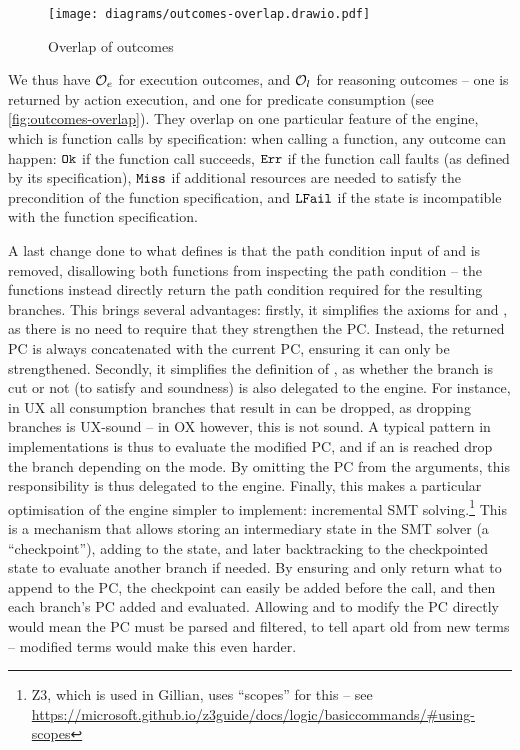 \begin{figure}
	\centering
	\texttt{[image: diagrams/outcomes-overlap.drawio.pdf]}
	\caption{Overlap of outcomes}
	\label{fig:outcomes-overlap}
\end{figure}

We thus have ${\cal O}_e$ for execution outcomes, and ${\cal O}_l$ for reasoning outcomes -- one is returned by action execution, and one for predicate consumption (see \autoref{fig:outcomes-overlap}). They overlap on one particular feature of the engine, which is function calls by specification: when calling a function, any outcome can happen: $\texttt{Ok}$ if the function call succeeds, $\texttt{Err}$ if the function call faults (as defined by its specification), $\texttt{Miss}$ if additional resources are needed to satisfy the precondition of the function specification, and $\texttt{LFail}$ if the state is incompatible with the function specification.

A last change done to what \cite{cse2} defines is that the path condition input of  \consume{} and \produce{} is removed, disallowing both functions from inspecting the path condition -- the functions instead directly return the path condition required for the resulting branches. This brings several advantages: firstly, it simplifies the axioms for \consume{} and \produce{}, as there is no need to require that they strengthen the PC. Instead, the returned PC is always concatenated with the current PC, ensuring it can only be strengthened. Secondly, it simplifies the definition of \consume{}, as whether the branch is cut or not (to satisfy \OX{} and \UX{} soundness) is also delegated to the engine. For instance, in UX all consumption branches that result in \LFail{} can be dropped, as dropping branches is UX-sound -- in OX however, this is not sound. A typical pattern in \consume{} implementations is thus to evaluate the modified PC, and if an \LFail{} is reached drop the branch depending on the mode. By omitting the PC from the arguments, this responsibility is thus delegated to the engine. Finally, this makes a particular optimisation of the engine simpler to implement: incremental SMT solving.\footnote{Z3, which is used in Gillian, uses ``scopes'' for this -- see \url{https://microsoft.github.io/z3guide/docs/logic/basiccommands/\#using-scopes}} This is a mechanism that allows storing an intermediary state in the SMT solver (a ``checkpoint''), adding to the state, and later backtracking to the checkpointed state to evaluate another branch if needed. By ensuring \consume{} and \produce{} only return what to append to the PC, the checkpoint can easily be added before the call, and then each branch's PC added and evaluated. Allowing \consume{} and \produce{} to modify the PC directly would mean the PC must be parsed and filtered, to tell apart old from new terms -- modified terms would make this even harder.

